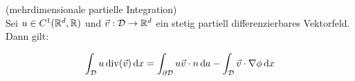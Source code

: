 \begin{Folgerung}(mehrdimensionale partielle Integration) \\
	\label{n_pI}
	Sei $ u \in C^1(\mathbb{R}^d, \mathbb{R})$ und $ \vec v : \mathcal{D} \to \mathbb{R}^d $ ein stetig partiell differenzierbares Vektorfeld.
	Dann gilt:
	
	\begin{align*}
		\int_{\mathcal{D}} u \operatorname{div} ( \vec v) \, \mathrm{d} x = \int_{\partial \mathcal{D}} u \vec v \cdot n \, \mathrm{d} a
		- \int_{\mathcal{D}} \vec v \cdot \nabla \phi \, \mathrm{d} x
	\end{align*}
\end{Folgerung}





